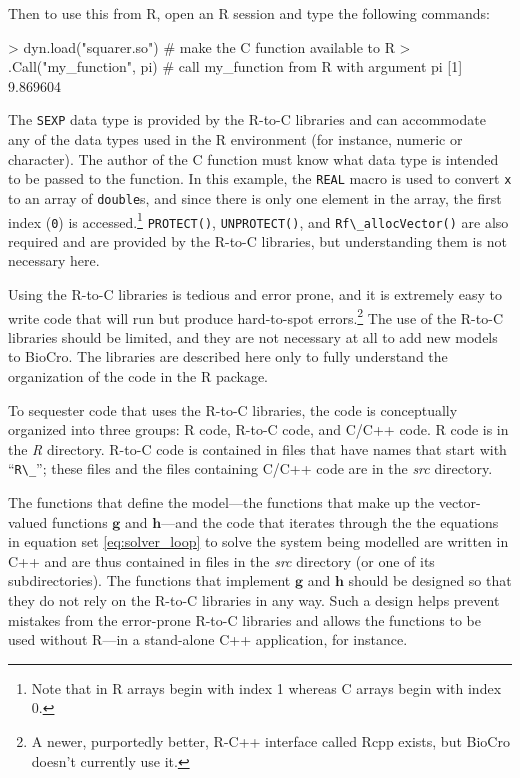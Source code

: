 \documentclass{article}\usepackage[]{graphicx}\usepackage[]{color}
\newcommand{\code}[1]{\lstinline[style=C++style]{#1}}
\newcommand{\g}{\mathbf{g}}
\newcommand{\h}{\mathbf{h}}
\begin{document}
Then to use this from R, open an R session and type the following commands:
\begin{center}
\begin{Rlisting}
> dyn.load("squarer.so") # make the C function available to R
> .Call("my_function", pi) # call my_function from R with argument pi
[1] 9.869604
\end{Rlisting}
\end{center}

The \code{SEXP} data type is provided by the R-to-C libraries and can
accommodate any of the data types used in the R environment (for
instance, numeric or character). The author of the C function must
know what data type is intended to be passed to the function. In this
example, the \code{REAL} macro is used to convert \code{x} to an array
of \code{double}s, and since there is only one element in the array,
the first index (\code{0}) is
accessed.\footnote{Note that in R arrays begin with
  index 1 whereas C arrays begin with index 0.}
\code{PROTECT()}, \code{UNPROTECT()}, and \code{Rf\_allocVector()} are
also required and are provided by the R-to-C libraries, but
understanding them is not necessary here.

Using the R-to-C libraries is tedious and error prone, and it is
extremely easy to write code that will run but produce hard-to-spot
errors.\footnote{A newer, purportedly better, R-C++ interface called
  Rcpp exists, but BioCro doesn't currently use it.} The use of the
R-to-C libraries should be limited, and they are not necessary at all
to add new models to BioCro. The libraries are described here only to
fully understand the organization of the code in the R package.

To sequester code that uses the R-to-C libraries, the code is
conceptually organized into three groups: R code, R-to-C code, and
C/C++ code. R code is in the \emph{R} directory. R-to-C code is
contained in files that have names that start with ``\code{R\_}'';
these files and the files containing C/C++ code are in the \emph{src}
directory.

The functions that define the model---the functions that make up the
vector-valued functions $\g$ and $\h$---and the code that iterates
through the the equations in equation set \ref{eq:solver_loop} to
solve the system being modelled are written in C++ and are thus
contained in files in the \emph{src} directory (or one of its
subdirectories). The functions that implement $\g$ and $\h$ should be
designed so that they do not rely on the R-to-C libraries in any
way. Such a design helps prevent mistakes from the error-prone R-to-C
libraries and allows the functions to be used without R---in a
stand-alone C++ application, for instance.
\end{document}
